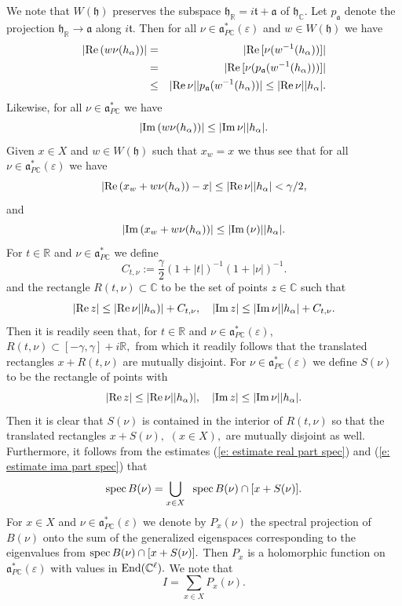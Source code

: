 \documentclass[12pt,a4paper]{article}
\def\msy#1{{\mathbb #1}}
\def\C{{\msy C}}
\def\R{{\msy R}}
\def\ga{\alpha}
\def\ge{\varepsilon}
\def\gg{\gamma}
\def\got#1{\mathfrak #1}
\def\fa{{\got a}}
\def\fh{{\got h}}
\def\ft{{\got t}}
\def\to{\rightarrow}
\def\Re{{\rm Re}\,}
\def\Im{{\rm Im}\,}
\def\End{{\rm End}}
\def\iC{{\scriptscriptstyle \C}}
\numberwithin{Thm}{section}
\numberwithin{equation}{section}
\def\faPdc{{\fa_{P\iC}^*}}
\numberwithin{equation}{section}
\def\ft{\mathfrak t}
\def\spec{{\rm spec}}
\def\faPdc{\fa_{P\iC}^*}
\def\fh{{\mathfrak h}}
\def\spec{{\rm spec}}
\def\xx{x}
\begin{document}
We note that $W(\fh)$ preserves the subspace $\fh_\R = i\ft + \fa$ of $\fh_\iC.$ 
Let $p_\fa$ denote the projection $\fh_\R \to \fa$ along $i\ft.$ 
Then for all $\nu \in \faPdc(\ge)$ and  $w \in W(\fh)$
we have
\begin{eqnarray*} 
| \Re(w\nu(h_\ga))| & = &  |\Re [\nu(w^{-1}(h_\ga))]| \\
&=& |\Re [\nu(p_\fa (w^{-1}(h_\ga)))]|\\
&\leq &  |\Re \nu| |p_\fa(w^{-1}(h_\ga))| \leq |\Re \nu| |h_\ga|.
\end{eqnarray*}
Likewise, for all $\nu \in \faPdc$ we have
$$ 
|\Im (w\nu(h_\ga))| \leq |\Im \nu||h_\ga|.
$$ 
Given $\xx \in X$ and $w \in W(\fh)$ such that $\xx_w= \xx$ we thus see that for all
$\nu \in \faPdc(\ge)$ we have
\begin{equation}
\label{e: estimate real part spec}
|\Re ( \xx_w  + w\nu(h_\ga)) - \xx| \leq |\Re \nu ||h_\ga| < \gg/2,
\end{equation}
and 
\begin{equation}
\label{e: estimate ima part spec} 
|\Im (\xx_w + w\nu(h_\ga))| \leq |\Im(\nu)||h_\ga|.
\end{equation} 
For $t\in \R$ and $\nu \in \faPdc$ we define 
$$ 
C_{t,\nu} := \frac{\gg}{2} ( 1+ |t|)^{-1}(1 + |\nu|)^{-1} .
$$ 
and the rectangle $R(t,\nu) \subset \C$ 
to be the set of points $z \in \C$ such that 
$$ 
|\Re z| \leq |\Re \nu| |h_\ga)| + C_{t,\nu}, \quad |\Im z| \leq |\Im \nu||h_\ga| + C_{t,\nu}.
$$ 
Then it is readily seen that, for $t \in \R$ and $\nu \in \faPdc(\ge),$ 
$R(t, \nu) \subset [-\gg, \gg] + i\R,$ from which it readily follows that the translated 
rectangles $\xx + R(t,\nu)$ are mutually disjoint. For $\nu \in \faPdc(\ge)$ 
we define $S(\nu)$ to be the rectangle of points with 
$$ 
|\Re z| \leq |\Re \nu| |h_\ga)|, \quad |\Im z| \leq |\Im \nu||h_\ga|.
$$ 
Then it is clear that $S(\nu)$ is contained in the interior of $R(t,\nu)$ 
so that the translated rectangles $\xx + S(\nu),$ $(\xx \in X),$ are mutually disjoint as well.
Furthermore, it follows from the estimates (\ref{e: estimate real part spec}) and 
(\ref{e: estimate ima part spec}) that 
\begin{equation}
\label{e: deco spec Bnu}
\spec\, B(\nu) = \bigcup_{\xx \in X}\;\; \spec\, B(\nu) \cap [\xx + S(\nu)].
\end{equation} 
For $\xx \in X$ and $\nu \in \faPdc(\ge)$ we denote by $P_{\xx}(\nu)$  the 
spectral projection of $B(\nu)$ onto the sum of the generalized eigenspaces 
corresponding to the eigenvalues from $\spec\, B(\nu) \cap [\xx + S(\nu)].$ 
Then $P_\xx$ is a holomorphic function on $\faPdc(\ge)$ with values in $\End(\C^\ell).$ We note that 
$$ 
I = \sum_{\xx \in X} P_\xx(\nu).
$$
\end{document}
